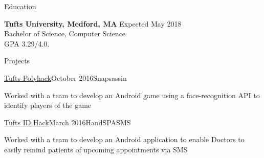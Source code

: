 \documentclass{resume} %
\begin{document}

\begin{rSection}{Education}

{\bf Tufts University, Medford, MA} \hfill {Expected May 2018} \\
Bachelor of Science, Computer Science \\
GPA 3.29/4.0. \smallskip

\end{rSection}


\begin{rSection}{Projects}

\begin{rSubsection}{\href{http://2016.polyhack.tufts.io/}{Tufts Polyhack}}{October 2016}{Snapsassin}
\item Worked with a team to develop an Android game using a face-recognition
    API to identify players of the game
\end{rSubsection}

\begin{rSubsection}{\href{https://idhack16.devpost.com/}{Tufts ID Hack}}{March 2016}{HandSPASMS}
\item Worked with a team to develop an Android application to enable Doctors
    to easily remind patients of upcoming appointments via SMS
\end{rSubsection}

\end{rSection}





\end{document}
